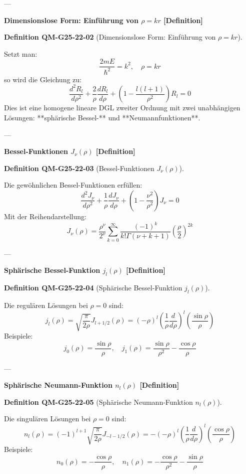 \documentclass[10pt, letterpaper]{article}
\newcommand{\CustomHeading}[3]{%
  \par\medskip\noindent%
  \textbf{#1 #2} \textnormal{(#3)}.\enskip%
}
\newenvironment{DEF}[2]{\begin{unitbox}\CustomHeading{Definition}{#1}{#2}}{\end{unitbox}}
\begin{document}
---

\textbf{Dimensionslose Form: Einführung von $\rho = kr$ [Definition]}

\begin{DEF}{QM-G25-22-02}{Dimensionslose Form: Einführung von $\rho = kr$}
Setzt man:
\[
\frac{2mE}{\hbar^2} = k^2, \quad \rho = kr
\]
so wird die Gleichung zu:
\[
\frac{d^2 R_l}{d\rho^2} + \frac{2}{\rho} \frac{d R_l}{d\rho} + \left(1 - \frac{l(l+1)}{\rho^2} \right) R_l = 0
\]
Dies ist eine homogene lineare DGL zweiter Ordnung mit zwei unabhängigen Lösungen: **sphärische Bessel-** und **Neumannfunktionen**.
\end{DEF}

---

\textbf{Bessel-Funktionen $J_\nu(\rho)$ [Definition]}

\begin{DEF}{QM-G25-22-03}{Bessel-Funktionen $J_\nu(\rho)$}
Die gewöhnlichen Bessel-Funktionen erfüllen:
\[
\frac{d^2 J_\nu}{d\rho^2} + \frac{1}{\rho} \frac{d J_\nu}{d\rho} + \left(1 - \frac{\nu^2}{\rho^2} \right) J_\nu = 0
\]
Mit der Reihendarstellung:
\[
J_\nu(\rho) = \frac{\rho^\nu}{2^\nu} \sum_{k=0}^\infty \frac{(-1)^k}{k! \Gamma(\nu + k + 1)} \left( \frac{\rho}{2} \right)^{2k}
\]
\end{DEF}

---

\textbf{Sphärische Bessel-Funktion $j_l(\rho)$ [Definition]}

\begin{DEF}{QM-G25-22-04}{Sphärische Bessel-Funktion $j_l(\rho)$}
Die regulären Lösungen bei $\rho = 0$ sind:
\[
j_l(\rho) = \sqrt{\frac{\pi}{2\rho}} J_{l + 1/2}(\rho) = (-\rho)^l \left( \frac{1}{\rho} \frac{d}{d\rho} \right)^l \left( \frac{\sin \rho}{\rho} \right)
\]
Beispiele:
\[
j_0(\rho) = \frac{\sin \rho}{\rho}, \quad j_1(\rho) = \frac{\sin \rho}{\rho^2} - \frac{\cos \rho}{\rho}
\]
\end{DEF}

---

\textbf{Sphärische Neumann-Funktion $n_l(\rho)$ [Definition]}

\begin{DEF}{QM-G25-22-05}{Sphärische Neumann-Funktion $n_l(\rho)$}
Die singulären Lösungen bei $\rho = 0$ sind:
\[
n_l(\rho) = (-1)^{l+1} \sqrt{\frac{\pi}{2\rho}} J_{-l - 1/2}(\rho) = -(-\rho)^l \left( \frac{1}{\rho} \frac{d}{d\rho} \right)^l \left( \frac{\cos \rho}{\rho} \right)
\]
Beispiele:
\[
n_0(\rho) = -\frac{\cos \rho}{\rho}, \quad n_1(\rho) = -\frac{\cos \rho}{\rho^2} - \frac{\sin \rho}{\rho}
\]
\end{DEF}
\end{document}
